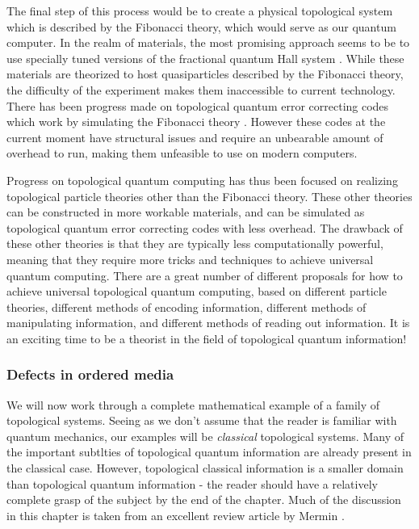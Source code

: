 \documentclass{article}
\theoremstyle{definition}
\newcommand{\0}{\left|0\right>}
\newcommand{\1}{\left|1\right>}
\numberwithin{figure}{section}
\begin{document}
The final step of this process would be to create a physical topological system which is described by the Fibonacci theory, which would serve as our quantum computer. In the realm of materials, the most promising approach seems to be to use specially tuned versions of the fractional quantum Hall system \cite{zhu2015fractional}. While these materials are theorized to host quasiparticles described by the Fibonacci theory, the difficulty of the experiment makes them inaccessible to current technology. There has been progress made on topological quantum error correcting codes which work by simulating the Fibonacci theory \cite{schotte2022quantum, schotte2022fault, xu2024non}. However these codes at the current moment have structural issues and require an unbearable amount of overhead to run, making them unfeasible to use on modern computers.

Progress on topological quantum computing has thus been focused on realizing topological particle theories other than the Fibonacci theory. These other theories can be constructed in more workable materials, and can be simulated as topological quantum error correcting codes with less overhead. The drawback of these other theories is that they are typically less computationally powerful, meaning that they require more tricks and techniques to achieve universal quantum computing. There are a great number of different proposals for how to achieve universal topological quantum computing, based on different particle theories, different methods of encoding information, different methods of manipulating information, and different methods of reading out information. It is an exciting time to be a theorist in the field of topological quantum information!

\subsubsection{Defects in ordered media}

We will now work through a complete mathematical example of a family of topological systems. Seeing as we don't assume that the reader is familiar with quantum mechanics, our examples will be \textit{classical} topological systems. Many of the important subtlties of topological quantum information are already present in the classical case. However, topological classical information is a smaller domain than topological quantum information - the reader should have a relatively complete grasp of the subject by the end of the chapter. Much of the discussion in this chapter is taken from an excellent review article by Mermin \cite{mermin1979topological}.
\end{document}
